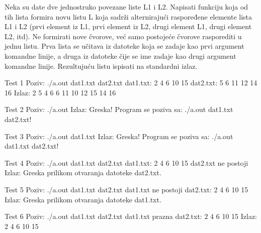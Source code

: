 \begin{Exercise}[label=610]
Neka su date dve jednostruko povezane liste L1 i L2. Napisati funkciju koja od 
tih lista formira novu listu L koja sadrži alternirajući raspoređene elemente 
lista L1 i L2 (prvi element iz L1, prvi element iz L2, drugi element L1,
drugi element L2, itd). Ne formirati nove čvorove, već samo postojeće čvorove 
rasporediti u jednu listu. Prva lista se učitava iz datoteke koja se zadaje 
kao prvi argument komandne linije, a druga iz datoteke čije se ime zadaje kao 
drugi argument komandne linije. Rezultujuću listu ispisati 
na standardni izlaz. 
\begin{miditest}
\begin{test}{Test 1}
Poziv: ./a.out dat1.txt dat2.txt
dat1.txt: 2 4 6 10 15
dat2.txt: 5 6 11 12 14 16
Izlaz:  
  2 5 4 6 6 11 10 12 15 14 16
\end{test}
\end{miditest}
\begin{miditest}
\begin{test}{Test 2}
Poziv: ./a.out
Izlaz: 
  Greska! Program se poziva sa: ./a.out dat1.txt dat2.txt!
\end{test}
\end{miditest}  
\begin{miditest}
\begin{test}{Test 3}
Poziv: ./a.out dat1.txt 
Izlaz: 
  Greska! Program se poziva sa: ./a.out dat1.txt dat2.txt!
\end{test}
\end{miditest}
\begin{miditest}
\begin{test}{Test 4}
Poziv: ./a.out dat1.txt dat2.txt
dat1.txt: 2 4 6 10 15
dat2.txt ne postoji
Izlaz: 
  Greska prilikom otvaranja datoteke dat2.txt.
\end{test}
\end{miditest}
\begin{miditest}
\begin{test}{Test 5}
Poziv: ./a.out dat1.txt dat2.txt
dat1.txt ne postoji
dat2.txt: 2 4 6 10 15
Izlaz: 
  Greska prilikom otvaranja datoteke dat1.txt.
\end{test}
\end{miditest}
\begin{miditest}
\begin{test}{Test 6}
Poziv: ./a.out dat1.txt dat2.txt
dat1.txt prazna
dat2.txt: 2 4 6 10 15
Izlaz: 
  2 4 6 10 15
\end{test}
\end{miditest}
\end{Exercise}
\begin{Answer}[ref=610]
\end{Answer}

